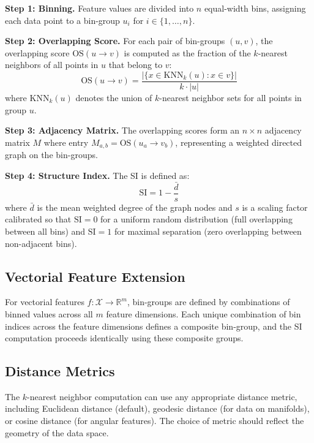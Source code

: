 \documentclass[12pt]{article}
\begin{document}
\textbf{Step 1: Binning.} Feature values are divided into $n$ equal-width bins, assigning each data point to a bin-group $u_i$ for $i \in \{1, \ldots, n\}$.

\textbf{Step 2: Overlapping Score.} For each pair of bin-groups $(u, v)$, the overlapping score $\text{OS}(u \rightarrow v)$ is computed as the fraction of the $k$-nearest neighbors of all points in $u$ that belong to $v$:
\begin{equation}
\text{OS}(u \rightarrow v) = \frac{|\{x \in \text{KNN}_k(u) : x \in v\}|}{k \cdot |u|}
\end{equation}
where $\text{KNN}_k(u)$ denotes the union of $k$-nearest neighbor sets for all points in group $u$.

\textbf{Step 3: Adjacency Matrix.} The overlapping scores form an $n \times n$ adjacency matrix $M$ where entry $M_{a,b} = \text{OS}(u_a \rightarrow v_b)$, representing a weighted directed graph on the bin-groups.

\textbf{Step 4: Structure Index.} The SI is defined as:
\begin{equation}
\text{SI} = 1 - \frac{\bar{d}}{s}
\end{equation}
where $\bar{d}$ is the mean weighted degree of the graph nodes and $s$ is a scaling factor calibrated so that $\text{SI} = 0$ for a uniform random distribution (full overlapping between all bins) and $\text{SI} = 1$ for maximal separation (zero overlapping between non-adjacent bins).

\subsection{Vectorial Feature Extension}

For vectorial features $f: \mathcal{X} \rightarrow \mathbb{R}^m$, bin-groups are defined by combinations of binned values across all $m$ feature dimensions. Each unique combination of bin indices across the feature dimensions defines a composite bin-group, and the SI computation proceeds identically using these composite groups.

\subsection{Distance Metrics}

The $k$-nearest neighbor computation can use any appropriate distance metric, including Euclidean distance (default), geodesic distance (for data on manifolds), or cosine distance (for angular features). The choice of metric should reflect the geometry of the data space.
\end{document}
